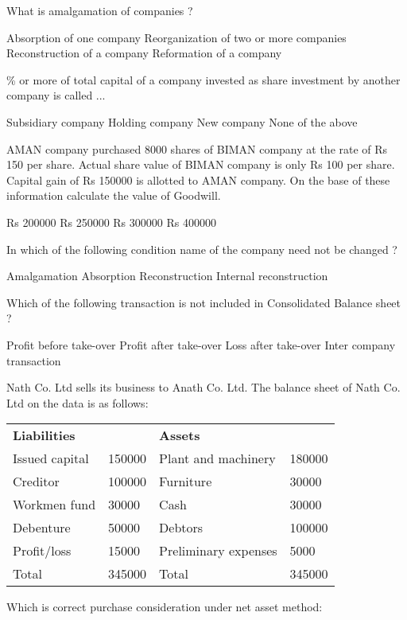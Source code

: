 \begin{questions}
\question What is amalgamation of companies ?
  \begin{choices}
  \choice Absorption of one company
  \choice Reorganization of two or more companies
  \choice Reconstruction of a company
  \choice Reformation of a company
  \end{choices}

\% or more of total capital of a company invested as share investment by another company is called ...
  \begin{choices}
  \choice Subsidiary company
  \choice Holding company
  \choice New company
  \choice None of the above
  \end{choices}

\question AMAN company purchased 8000 shares of BIMAN company at the rate of Rs 150 per share. Actual share value of BIMAN company is only Rs 100 per share. Capital gain of Rs 150000 is allotted to AMAN company. On the base of these information calculate the value of Goodwill.
  \begin{choices}
  \choice Rs 200000
  \choice Rs 250000
  \choice Rs 300000
  \choice Rs 400000
  \end{choices}

\question In which of the following condition name of the company need not be changed ?
  \begin{choices}
  \choice Amalgamation
  \choice Absorption
  \choice Reconstruction
  \choice Internal reconstruction
  \end{choices}

\question Which of the following transaction is not included in Consolidated Balance sheet ?
  \begin{choices}
  \choice Profit before take-over
  \choice Profit after take-over
  \choice Loss after take-over
  \choice Inter company transaction
  \end{choices}

\question Nath Co. Ltd sells its business to Anath Co. Ltd. The balance sheet of Nath Co. Ltd on the data is as follows:
  \begin{table}[h]
  \centering
  \begin{tabular}{llll}
    \textbf{Liabilities} & & \textbf{Assets} & \\[2mm]
    Issued capital & 150000 & Plant and machinery & 180000 \\
    Creditor & 100000 & Furniture & 30000 \\
    Workmen fund & 30000 & Cash & 30000 \\
    Debenture & 50000 & Debtors & 100000 \\
    Profit/loss & 15000 & Preliminary expenses & 5000 \\
    Total & 345000 & Total & 345000
  \end{tabular}
  \end{table}
  Which is correct purchase consideration under net asset method:
  \begin{choices}
  \end{choices}


\end{questions}
